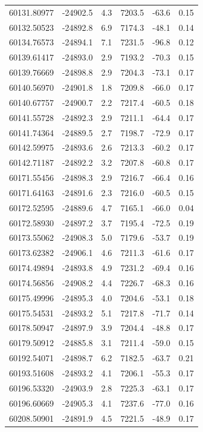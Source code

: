 \documentclass[fleqn,usenatbib,useAMS]{mnras}
\begin{document}
\begin{table}
\begin{tabular}[t]{cccccc}
60131.80977 & -24902.5 & 4.3 & 7203.5 & -63.6 & 0.15\\ 
60132.50523 & -24892.8 & 6.9 & 7174.3 & -48.1 & 0.14\\ 
60134.76573 & -24894.1 & 7.1 & 7231.5 & -96.8 & 0.12\\ 
60139.61417 & -24893.0 & 2.9 & 7193.2 & -70.3 & 0.15\\ 
60139.76669 & -24898.8 & 2.9 & 7204.3 & -73.1 & 0.17\\ 
60140.56970 & -24901.8 & 1.8 & 7209.8 & -66.0 & 0.17\\ 
60140.67757 & -24900.7 & 2.2 & 7217.4 & -60.5 & 0.18\\ 
60141.55728 & -24892.3 & 2.9 & 7211.1 & -64.4 & 0.17\\ 
60141.74364 & -24889.5 & 2.7 & 7198.7 & -72.9 & 0.17\\ 
60142.59975 & -24893.6 & 2.6 & 7213.3 & -60.2 & 0.17\\ 
60142.71187 & -24892.2 & 3.2 & 7207.8 & -60.8 & 0.17\\ 
60171.55456 & -24898.3 & 2.9 & 7216.7 & -66.4 & 0.16\\ 
60171.64163 & -24891.6 & 2.3 & 7216.0 & -60.5 & 0.15\\ 
60172.52595 & -24889.6 & 4.7 & 7165.1 & -66.0 & 0.04\\ 
60172.58930 & -24897.2 & 3.7 & 7195.4 & -72.5 & 0.19\\ 
60173.55062 & -24908.3 & 5.0 & 7179.6 & -53.7 & 0.19\\ 
60173.62382 & -24906.1 & 4.6 & 7211.3 & -61.6 & 0.17\\ 
60174.49894 & -24893.8 & 4.9 & 7231.2 & -69.4 & 0.16\\ 
60174.56856 & -24908.2 & 4.4 & 7226.7 & -68.3 & 0.16\\ 
60175.49996 & -24895.3 & 4.0 & 7204.6 & -53.1 & 0.18\\ 
60175.54531 & -24893.2 & 5.1 & 7217.8 & -71.7 & 0.14\\ 
60178.50947 & -24897.9 & 3.9 & 7204.4 & -48.8 & 0.17\\ 
60179.50912 & -24885.8 & 3.1 & 7211.4 & -59.0 & 0.15\\ 
60192.54071 & -24898.7 & 6.2 & 7182.5 & -63.7 & 0.21\\ 
60193.51608 & -24893.2 & 4.1 & 7206.1 & -55.3 & 0.17\\ 
60196.53320 & -24903.9 & 2.8 & 7225.3 & -63.1 & 0.17\\ 
60196.60669 & -24905.3 & 4.1 & 7237.6 & -77.0 & 0.16\\ 
60208.50901 & -24891.9 & 4.5 & 7221.5 & -48.9 & 0.17\\ 

\end{tabular}
\end{table}
\end{document}
